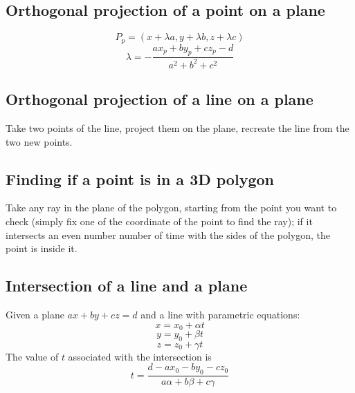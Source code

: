 \subsection{Orthogonal projection of a point on a plane}
$$P_p=(x+\lambda a, y+\lambda b, z + \lambda c)$$
$$\lambda = -\frac{ax_p+by_p+cz_p-d}{a^2+b^2+c^2}$$
\subsection{Orthogonal projection of a line on a plane}
Take two points of the line, project them on the plane, recreate the line from the two new points.
\subsection{Finding if a point is in a 3D polygon}
Take any ray in the plane of the polygon, starting from the point you want to check (simply fix one of the coordinate of the point to find the ray); if it intersects an even number number of time with the sides of the polygon, the point is inside it.
\subsection{Intersection of a line and a plane}
Given a plane $ax+by+cz=d$ and a line with parametric equations:
$$x=x_0+\alpha t$$
$$y=y_0+\beta t$$
$$z=z_0+\gamma t$$
The value of $t$ associated with the intersection is
$$t=\frac{d-ax_0-by_0-cz_0}{a\alpha+b\beta+c\gamma}$$
